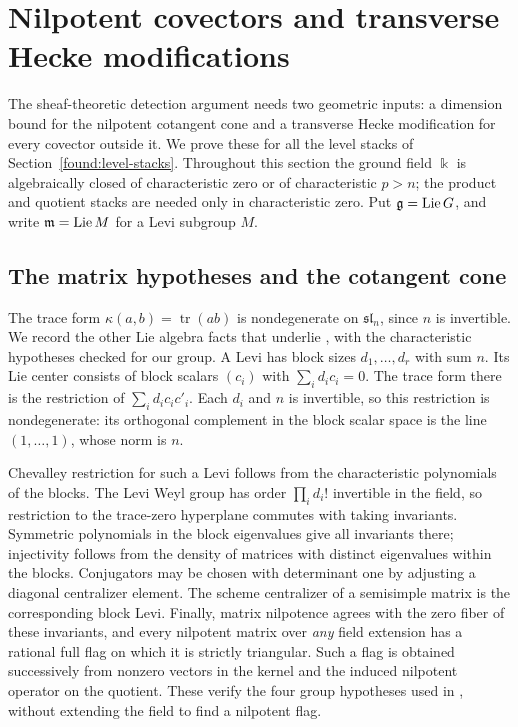 \section{Nilpotent covectors and transverse Hecke modifications}
\label{geom:section}

The sheaf-theoretic detection argument needs two geometric inputs: a
dimension bound for the nilpotent cotangent cone and a transverse Hecke
modification for every covector outside it.  We prove these for all the
level stacks of Section~\ref{found:level-stacks}.  Throughout this
section the ground field $\Bbbk$ is algebraically closed of characteristic zero
or of characteristic $p>n$; the product and quotient stacks are needed
only in characteristic zero.  Put $\mathfrak g=\operatorname{Lie} G$, and write
$\mathfrak m=\operatorname{Lie} M$ for a Levi subgroup $M$.

\subsection{The matrix hypotheses and the cotangent cone}

The trace form $\kappa(a,b)=\operatorname{tr}(ab)$ is nondegenerate on
$\mathfrak{sl}_n$, since $n$ is invertible.  We record the other Lie
algebra facts that underlie \cite[\S3]{CT}, with the characteristic
hypotheses checked for our group.  A Levi has block sizes
$d_1,\ldots,d_r$ with sum $n$.  Its Lie center consists of block scalars
$(c_i)$ with $\sum_i d_ic_i=0$.  The trace form there is the restriction
of $\sum_i d_ic_ic'_i$.  Each $d_i$ and $n$ is invertible, so this
restriction is nondegenerate: its orthogonal complement in the block
scalar space is the line $(1,\ldots,1)$, whose norm is $n$.

Chevalley restriction for such a Levi follows from the characteristic
polynomials of the blocks.  The Levi Weyl group has order
$\prod_i d_i!$ invertible in the field, so restriction to the trace-zero
hyperplane commutes with taking invariants.  Symmetric polynomials in
the block eigenvalues give all invariants there; injectivity follows
from the density of matrices with distinct eigenvalues within the
blocks.  Conjugators may be chosen with determinant one by adjusting
a diagonal centralizer element.  The scheme centralizer of a semisimple
matrix is the corresponding block Levi.  Finally, matrix nilpotence
agrees with the zero fiber of these invariants, and every nilpotent
matrix over \emph{any} field extension has a rational full flag on
which it is strictly triangular.  Such a flag is obtained successively
from nonzero vectors in the kernel and the induced nilpotent operator
on the quotient.  These verify the four group hypotheses used in
\cite[\S\S1 and~3]{CT}, without extending the field to find a nilpotent
flag.

